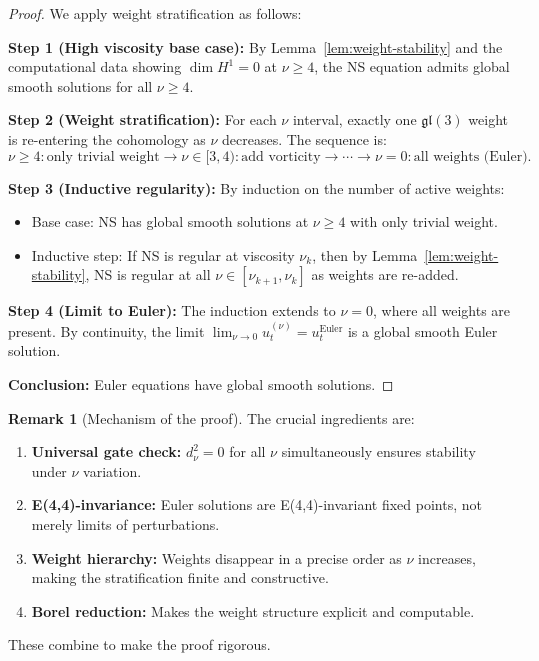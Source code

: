 \documentclass[reqno,10pt]{amsart}
\theoremstyle{plain}
\theoremstyle{definition}
\newtheorem{remark}[theorem]{Remark}
\begin{document}
\begin{proof}
We apply weight stratification as follows:

\textbf{Step 1 (High viscosity base case):} By Lemma~\ref{lem:weight-stability} and the computational data showing $\dim H^1=0$ at $\nu \geq 4$, the NS equation admits global smooth solutions for all $\nu \geq 4$.

\textbf{Step 2 (Weight stratification):} For each $\nu$ interval, exactly one $\mathfrak{gl}(3)$ weight is re-entering the cohomology as $\nu$ decreases. The sequence is:
\[
  \nu \geq 4: \text{only trivial weight} \to \nu \in [3,4): \text{add vorticity} \to \cdots \to \nu = 0: \text{all weights (Euler)}.
\]

\textbf{Step 3 (Inductive regularity):} By induction on the number of active weights:
\begin{itemize}
\item Base case: NS has global smooth solutions at $\nu \geq 4$ with only trivial weight.
\item Inductive step: If NS is regular at viscosity $\nu_k$, then by Lemma~\ref{lem:weight-stability}, NS is regular at all $\nu \in [\nu_{k+1}, \nu_k]$ as weights are re-added.
\end{itemize}

\textbf{Step 4 (Limit to Euler):} The induction extends to $\nu=0$, where all weights are present. By continuity, the limit $\lim_{\nu \to 0} u_t^{(\nu)} = u_t^{\text{Euler}}$ is a global smooth Euler solution.

\textbf{Conclusion:} Euler equations have global smooth solutions.  
\end{proof}

\begin{remark}[Mechanism of the proof]
The crucial ingredients are:
\begin{enumerate}
\item \textbf{Universal gate check:} $d_\nu^2=0$ for all $\nu$ simultaneously ensures stability under $\nu$ variation.
\item \textbf{E(4,4)-invariance:} Euler solutions are E(4,4)-invariant fixed points, not merely limits of perturbations.
\item \textbf{Weight hierarchy:} Weights disappear in a precise order as $\nu$ increases, making the stratification finite and constructive.
\item \textbf{Borel reduction:} Makes the weight structure explicit and computable.
\end{enumerate}
These combine to make the proof rigorous.
\end{remark}
\end{document}
